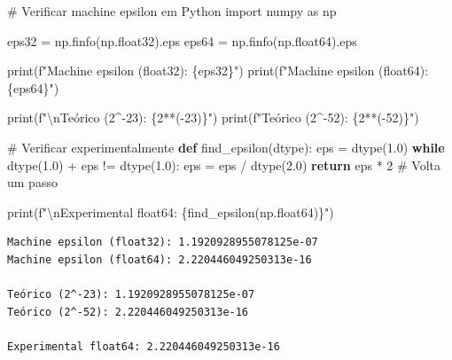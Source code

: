 \documentclass[
  11pt,
  letterpaper,
  DIV=11,
  numbers=noendperiod]{scrartcl}
\newenvironment{Shaded}{\begin{snugshade}}{\end{snugshade}}
\newcommand{\BuiltInTok}[1]{\textcolor[rgb]{0.00,0.23,0.31}{#1}}
\newcommand{\CharTok}[1]{\textcolor[rgb]{0.13,0.47,0.30}{#1}}
\newcommand{\CommentTok}[1]{\textcolor[rgb]{0.37,0.37,0.37}{#1}}
\newcommand{\ControlFlowTok}[1]{\textcolor[rgb]{0.00,0.23,0.31}{\textbf{#1}}}
\newcommand{\DecValTok}[1]{\textcolor[rgb]{0.68,0.00,0.00}{#1}}
\newcommand{\FloatTok}[1]{\textcolor[rgb]{0.68,0.00,0.00}{#1}}
\newcommand{\ImportTok}[1]{\textcolor[rgb]{0.00,0.46,0.62}{#1}}
\newcommand{\KeywordTok}[1]{\textcolor[rgb]{0.00,0.23,0.31}{\textbf{#1}}}
\newcommand{\NormalTok}[1]{\textcolor[rgb]{0.00,0.23,0.31}{#1}}
\newcommand{\OperatorTok}[1]{\textcolor[rgb]{0.37,0.37,0.37}{#1}}
\newcommand{\SpecialCharTok}[1]{\textcolor[rgb]{0.37,0.37,0.37}{#1}}
\newcommand{\SpecialStringTok}[1]{\textcolor[rgb]{0.13,0.47,0.30}{#1}}
\begin{document}
\begin{Shaded}
\begin{Highlighting}[]
\CommentTok{\# Verificar machine epsilon em Python}
\ImportTok{import}\NormalTok{ numpy }\ImportTok{as}\NormalTok{ np}

\NormalTok{eps32 }\OperatorTok{=}\NormalTok{ np.finfo(np.float32).eps}
\NormalTok{eps64 }\OperatorTok{=}\NormalTok{ np.finfo(np.float64).eps}

\BuiltInTok{print}\NormalTok{(}\SpecialStringTok{f"Machine epsilon (float32): }\SpecialCharTok{\{}\NormalTok{eps32}\SpecialCharTok{\}}\SpecialStringTok{"}\NormalTok{)}
\BuiltInTok{print}\NormalTok{(}\SpecialStringTok{f"Machine epsilon (float64): }\SpecialCharTok{\{}\NormalTok{eps64}\SpecialCharTok{\}}\SpecialStringTok{"}\NormalTok{)}

\BuiltInTok{print}\NormalTok{(}\SpecialStringTok{f"}\CharTok{\textbackslash{}n}\SpecialStringTok{Teórico (2\^{}{-}23): }\SpecialCharTok{\{}\DecValTok{2}\OperatorTok{**}\NormalTok{(}\OperatorTok{{-}}\DecValTok{23}\NormalTok{)}\SpecialCharTok{\}}\SpecialStringTok{"}\NormalTok{)}
\BuiltInTok{print}\NormalTok{(}\SpecialStringTok{f"Teórico (2\^{}{-}52): }\SpecialCharTok{\{}\DecValTok{2}\OperatorTok{**}\NormalTok{(}\OperatorTok{{-}}\DecValTok{52}\NormalTok{)}\SpecialCharTok{\}}\SpecialStringTok{"}\NormalTok{)}

\CommentTok{\# Verificar experimentalmente}
\KeywordTok{def}\NormalTok{ find\_epsilon(dtype):}
\NormalTok{    eps }\OperatorTok{=}\NormalTok{ dtype(}\FloatTok{1.0}\NormalTok{)}
    \ControlFlowTok{while}\NormalTok{ dtype(}\FloatTok{1.0}\NormalTok{) }\OperatorTok{+}\NormalTok{ eps }\OperatorTok{!=}\NormalTok{ dtype(}\FloatTok{1.0}\NormalTok{):}
\NormalTok{        eps }\OperatorTok{=}\NormalTok{ eps }\OperatorTok{/}\NormalTok{ dtype(}\FloatTok{2.0}\NormalTok{)}
    \ControlFlowTok{return}\NormalTok{ eps }\OperatorTok{*} \DecValTok{2}  \CommentTok{\# Volta um passo}

\BuiltInTok{print}\NormalTok{(}\SpecialStringTok{f"}\CharTok{\textbackslash{}n}\SpecialStringTok{Experimental float64: }\SpecialCharTok{\{}\NormalTok{find\_epsilon(np.float64)}\SpecialCharTok{\}}\SpecialStringTok{"}\NormalTok{)}
\end{Highlighting}
\end{Shaded}

\begin{verbatim}
Machine epsilon (float32): 1.1920928955078125e-07
Machine epsilon (float64): 2.220446049250313e-16

Teórico (2^-23): 1.1920928955078125e-07
Teórico (2^-52): 2.220446049250313e-16

Experimental float64: 2.220446049250313e-16
\end{verbatim}
\end{document}
